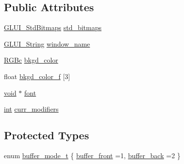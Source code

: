 \subsection*{Public Attributes}
\begin{DoxyCompactItemize}
\item 
\hyperlink{class_g_l_u_i___std_bitmaps}{G\+L\+U\+I\+\_\+\+Std\+Bitmaps} \hyperlink{class_g_l_u_i___main_adae87a2e684c2da03d2f8946913eb63d}{std\+\_\+bitmaps}
\item 
\hyperlink{glui_8h_aada824856f7bcf29794719981ebd8f60}{G\+L\+U\+I\+\_\+\+String} \hyperlink{class_g_l_u_i___main_a699c852cb777273543f38506e71c9e22}{window\+\_\+name}
\item 
\hyperlink{class_r_g_bc}{R\+G\+Bc} \hyperlink{class_g_l_u_i___main_a8d939a35dd9fd89091e4345d12f23936}{bkgd\+\_\+color}
\item 
float \hyperlink{class_g_l_u_i___main_a703f236c77d05226bf6ffd01c5c80d0d}{bkgd\+\_\+color\+\_\+f} \mbox{[}3\mbox{]}
\item 
\hyperlink{wglext_8h_a9e6b7f1933461ef318bb000d6bd13b83}{void} $\ast$ \hyperlink{class_g_l_u_i___main_a349e75284a3c1d4e5e8d1f2903d65f8b}{font}
\item 
\hyperlink{wglext_8h_a500a82aecba06f4550f6849b8099ca21}{int} \hyperlink{class_g_l_u_i___main_a96ca3271c5e6a33bd340bd90aa010b14}{curr\+\_\+modifiers}
\end{DoxyCompactItemize}
\subsection*{Protected Types}
\begin{DoxyCompactItemize}
\item 
enum \hyperlink{class_g_l_u_i___main_a0024f5e2750f6fe9e428ff885cf6d62e}{buffer\+\_\+mode\+\_\+t} \{ \hyperlink{class_g_l_u_i___main_a0024f5e2750f6fe9e428ff885cf6d62ea96e503bd03e3d418f350f3a854d0292d}{buffer\+\_\+front} =1, 
\hyperlink{class_g_l_u_i___main_a0024f5e2750f6fe9e428ff885cf6d62ea839b43cd2decf85c6bdcf738d92e122c}{buffer\+\_\+back} =2
 \}
\end{DoxyCompactItemize}
